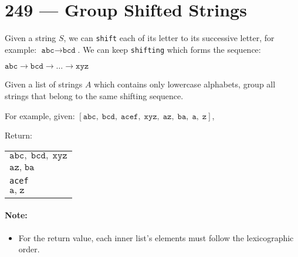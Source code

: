 \section{249 --- Group Shifted Strings}
Given a string $S$, we can \texttt{shift} each of its letter to its successive letter, for example: $\texttt{abc} \longrightarrow \texttt{bcd}$. We can keep \texttt{shifting} which forms the sequence:
\par
$\texttt{abc} \longrightarrow \texttt{bcd} \longrightarrow \ldots \longrightarrow \texttt{xyz}$
\par
Given a list of strings $A$ which contains only lowercase alphabets, group all strings that belong to the same shifting sequence.
\par
For example, given: 
$[\texttt{abc},\; \texttt{bcd},\; \texttt{acef},\; \texttt{xyz},\; \texttt{az},\; \texttt{ba},\; \texttt{a},\; \texttt{z}]$,
\par
Return:
\begin{table}[H]
\begin{tabular}{l}
$\texttt{abc},\;\texttt{bcd},\;\texttt{xyz}$ \\
$\texttt{az},\;\texttt{ba}$\\
\texttt{acef}\\
$\texttt{a},\;\texttt{z}$
\end{tabular}
\end{table}

\paragraph{Note:} 
\begin{itemize}
\item For the return value, each inner list's elements must follow the lexicographic order.
\end{itemize}

